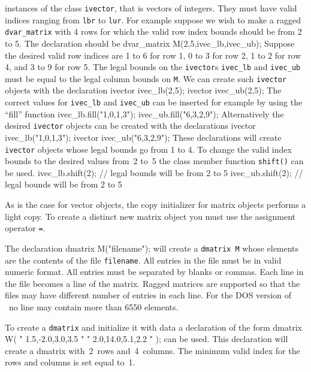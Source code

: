 \documentclass[12pt]{book}
\begin{document}
instances of the class {\tt ivector}, that is vectors of
integers. They must have valid indices ranging from
{\tt lbr} to {\tt lur}. For example suppose we wish to make
a ragged {\tt dvar\_matrix} with 4 rows for which the valid row index bounds 
should be from 2 to 5. The declaration should be
\bestbreak
\beginexample 
dvar_matrix M(2,5,ivec_lb,ivec_ub);
\endexample
Suppose the desired valid row indices are 1 to 6 for row 1,
0 to 3 for row 2, 1 to 2 for row 4, and 3 to 9 for row 5.
The legal bounds on the {\tt ivector}s {\tt ivec\_lb} and {\tt ivec\_ub}
must be equal to the legal column bounds on {\tt M}. We can create such
{\tt ivector} objects with the declaration
\beginexample
ivector ivec_lb(2,5);
ivector ivec_ub(2,5);
\endexample
The correct values for {\tt ivec\_lb} and {\tt ivec\_ub} can
be inserted for example by using the ``fill'' function
\beginexample
ivec_lb.fill("{1,0,1,3}"); 
ivec_ub.fill("{6,3,2,9}"); 
\endexample
Alternatively the desired {\tt ivector} objects can be created with the
declarations
\beginexample
ivector ivec_lb("{1,0,1,3}"); 
ivector ivec_ub("{6,3,2,9}"); 
\endexample
These declarations will create {\tt ivector} objects whose legal bounds
go from 1 to 4. To change the valid index bounds to the desired values
from~2 to~5 the class member function {\tt shift()} can be used. 
\beginexample
ivec_lb.shift(2); // legal bounds will be from 2 to 5
ivec_ub.shift(2); // legal bounds will be from 2 to 5
\endexample

As is the case for vector objects, the copy initializer for matrix objects
performs a light copy. To create a distinct new matrix object you must
use the assignment operator {\tt =}.

The declaration
\beginexamplea
dmatrix M("filename");        
\endexample
\noindent will create a {\tt dmatrix M} whose elements are the contents 
of the file
{\tt filename}. 
All entries in the file
must be in valid numeric format. All entries must be separated by blanks
or commas.
Each line in the file becomes a line of the matrix. Ragged matrices are 
supported so that the files may have different number of entries in each 
line. For the DOS version of \AD\ no line may contain more than 6550
elements. 

To create a {\tt dmatrix} and initialize it with data a declaration of
the form
\beginexamplea
dmatrix W( "{ 1.5,-2.0,3.0,3.5 }"
           "{ 2.0,14.0,5.1,2.2 }" );
\endexample
\noindent can be used. This declaration will create a dmatrix with~2~rows
and~4~columns. The minimum valid index for the rows and columns is
set equal to~1.
\end{document}
